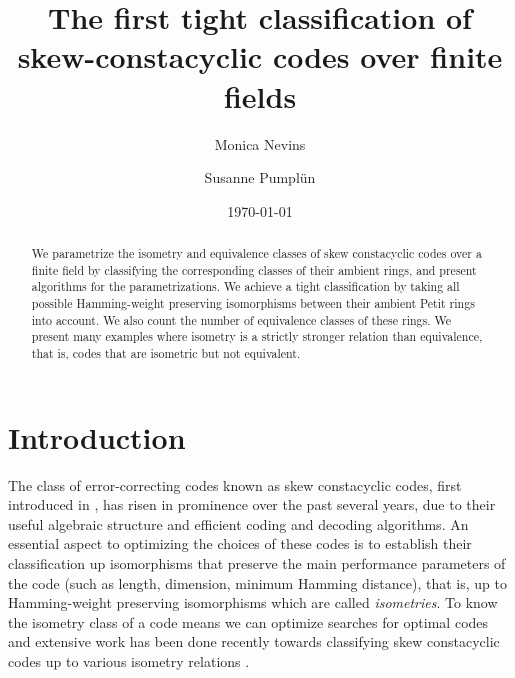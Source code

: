 \documentclass[11pt]{amsart}
\theoremstyle{plain}
\theoremstyle{definition}
\numberwithin{equation}{section}
\numberwithin{figure}{section}
\begin{document}
\title{The first  tight classification of skew-constacyclic codes over finite fields}


\author{Monica Nevins}
\address{Department of Mathematics and Statistics, University of Ottawa, Ottawa, Canada K1N 6N5}


\author{Susanne Pumpl\"un}
\address{School of Mathematical Sciences, University of Nottingham,
Nottingham NG7 2RD, United Kingdom}




\date{\today}



\begin{abstract}
We parametrize the isometry and equivalence classes of skew constacyclic codes  over a finite field by classifying the corresponding classes of their ambient rings, and present algorithms for the parametrizations. We achieve a tight classification by taking all possible Hamming-weight preserving isomorphisms between their ambient Petit rings into account.  We also count the number of equivalence classes %
of these rings.  We present many examples where isometry is a strictly stronger relation than equivalence, that is, codes that are isometric but not equivalent.
\end{abstract}



\maketitle

\section{Introduction}
The class of error-correcting codes known as skew constacyclic codes, first introduced in \cite{BoucherGeiselmannUlmer2007}, has risen in prominence over the past several years, due to their useful algebraic structure and efficient coding and decoding algorithms.  An essential aspect to optimizing the choices of these codes is to establish their classification up isomorphisms that preserve the main performance parameters of the code (such as length, dimension, minimum Hamming distance), that is, up to Hamming-weight preserving isomorphisms which are called \emph{isometries}.  To know the isometry class of a code means we can optimize searches for optimal codes and  extensive work has been done recently towards classifying  skew constacyclic codes up to various isometry relations \cite{BoulanouarBatoulBoucher2021, BLMS2024, OuazzouNajmeddineAydin2025, LobilloMunoz2025, NevinsPumpluen2025submitted}.
\end{document}
